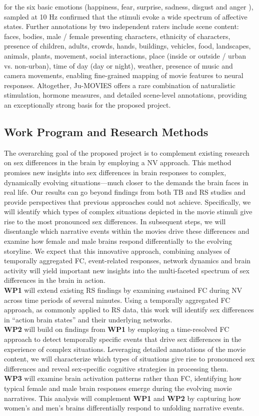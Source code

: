 \documentclass[11pt,a4paper]{article}
\begin{document}
for the six basic emotions (happiness, fear, surprise, sadness, disgust and anger \parencite{ekmanConstantsCulturesFace1971a}), 
sampled at 10 Hz confirmed that the stimuli evoke a wide spectrum of affective states. 
Further annotations by two independent raters include scene content: faces, bodies, male / female presenting characters, ethnicity of characters, presence of children, 
adults, crowds, hands, buildings, vehicles, food, landscapes, animals, plants, movement, social interactions, 
place (inside or outside / urban vs. non-urban), time of day (day or night), weather, presence of music and 
camera movements, enabling fine-grained mapping of movie features to neural responses.
Altogether, Ju-MOVIES offers a rare combination of naturalistic stimulation, hormone measures, 
and detailed scene-level annotations, providing an exceptionally strong basis for the proposed project.

\subsection*{Work Program and Research Methods}
The overarching goal of the proposed project is to complement existing research on sex differences in the brain by 
employing a NV approach. This method promises new insights into sex differences in brain responses to complex, 
dynamically evolving situations—much closer to the demands the brain faces in real life. Our results can go beyond 
findings from both TB and RS studies and provide perspectives that previous approaches could not achieve. 
Specifically, we will identify which types of complex situations depicted in the movie stimuli give rise to the 
most pronounced sex differences. In subsequent steps, we will disentangle which narrative events within the 
movies drive these differences and examine how female and male brains respond differentially to the evolving storyline. 
We expect that this innovative approach, combining analyses of temporally aggregated 
FC, event-related responses, network dynamics and brain activity will yield important new insights into 
the multi-faceted spectrum of sex differences in the brain in action.\\
\textbf{WP1} will extend existing RS findings by examining sustained FC during NV across time periods of several 
minutes. Using a temporally aggregated FC approach, as commonly applied to RS data, this work will identify 
sex differences in “action brain states” and their underlying networks.\\
\textbf{WP2} will build on findings from \textbf{WP1} by employing a time-resolved FC approach to detect temporally specific events 
that drive sex differences in the experience of complex situations. Leveraging detailed annotations of the 
movie content, we will characterize which types of situations give rise to pronounced sex differences and 
reveal sex-specific cognitive strategies in processing them.\\
\textbf{WP3} will examine brain activation patterns rather than FC, identifying how typical female and male 
brain responses emerge during the evolving movie narratives. This analysis will 
complement \textbf{WP1} and \textbf{WP2} by capturing how women's and men's brains differentially respond 
to unfolding narrative events.
\end{document}
